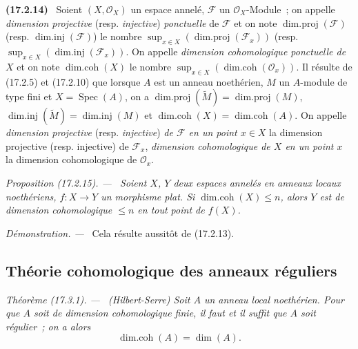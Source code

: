 \documentclass[10pt,oneside]{book}
\makeatletter
\newcommand{\setmanualcurrentlabel}[1]{\def\@currentlabel{#1}}
\newenvironment{env}[1][]{\setmanualcurrentlabel{#1}\par\medskip\noindent\textbf{(#1)}\ }{\par}
\newenvironment{proposition}[1][]{%
  \setmanualcurrentlabel{#1}\par\medskip\noindent\itshape Proposition (#1). ---\ }{\par}
\newenvironment{theorem}[1][]{%
  \setmanualcurrentlabel{#1}\par\medskip\noindent\itshape Théorème (#1). ---\ }{\par}
\newenvironment{proof}{%
  \par\medskip\noindent\textit{Démonstration. ---\ }}{\par}
\makeatother
\begin{document}
\begin{env}[17.2.14]
\label{0.17.2.14-fr}
Soient $(X,\mathscr{O}_X)$ un espace annelé, $\mathscr{F}$ un
$\mathscr{O}_X$-Module~; on appelle \emph{dimension projective} (resp.
\emph{injective}) \emph{ponctuelle} de $\mathscr{F}$ et on note
$\operatorname{dim.proj}(\mathscr{F})$ (resp.
$\operatorname{dim.inj}(\mathscr{F})$) le nombre
$\sup_{x\in X}(\operatorname{dim.proj}(\mathscr{F}_x))$ (resp.
$\sup_{x\in X}(\operatorname{dim.inj}(\mathscr{F}_x))$. On appelle
\emph{dimension cohomologique ponctuelle de $X$} et on note
$\operatorname{dim.coh}(X)$ le nombre
$\sup_{x\in X}(\operatorname{dim.coh}(\mathscr{O}_x))$. Il résulte de
(17.2.5) et (17.2.10) que lorsque $A$ est un anneau noethérien, $M$ un
$A$-module de type fini et $X=\operatorname{Spec}(A)$, on a
$\operatorname{dim.proj}(\widetilde{M})=\operatorname{dim.proj}(M)$,
$\operatorname{dim.inj}(\widetilde{M})=\operatorname{dim.inj}(M)$ et
$\operatorname{dim.coh}(X)=\operatorname{dim.coh}(A)$. On appelle
\emph{dimension projective} (resp. \emph{injective}) \emph{de $\mathscr{F}$ en
un point $x\in X$} la dimension projective (resp. injective) de
$\mathscr{F}_x$, \emph{dimension cohomologique de $X$ en un point $x$} la
dimension cohomologique de $\mathscr{O}_x$.
\end{env}

\begin{proposition}[17.2.15]
\label{0.17.2.15-fr}
Soient $X$, $Y$ deux espaces annelés en anneaux locaux noethériens,
$f:X\longrightarrow Y$ un morphisme plat. Si
$\operatorname{dim.coh}(X)\leq n$, alors $Y$ est de dimension cohomologique
$\leq n$ en tout point de $f(X)$.
\end{proposition}

\begin{proof}
Cela résulte aussitôt de (17.2.13).
\end{proof}

\subsection{Théorie cohomologique des anneaux réguliers}
\label{subsection:0.17.3-fr}

\begin{theorem}[17.3.1]
\label{0.17.3.1-fr}
\textnormal{(Hilbert-Serre)} Soit $A$ un anneau local noethérien. Pour que $A$
soit de dimension cohomologique finie, il faut et il suffit que $A$ soit
régulier~; on a alors
\begin{equation}
\label{0.17.3.1.1-fr}
\tag{17.3.1.1}
  \operatorname{dim.coh}(A)=\dim(A).
\end{equation}
\end{theorem}
\end{document}

